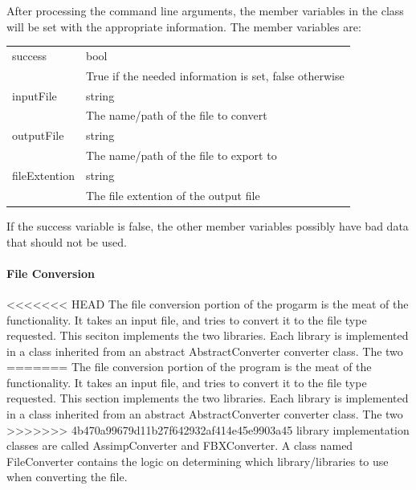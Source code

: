     After processing the command line arguments, the member variables in the class will be set with the appropriate information.  The member variables are:

    \begin{tabular}{l l}
        \centering
        success & bool \\
        & True if the needed information is set, false otherwise \\

        inputFile & string \\
        & The name/path of the file to convert \\

        outputFile & string \\
        & The name/path of the file to export to \\

        fileExtention & string \\
        & The file extention of the output file
    \end{tabular}

    If the success variable is false, the other member variables possibly have bad data that should not be used.

    \paragraph{File Conversion}
    \hfill \break
<<<<<<< HEAD
    The file conversion portion of the progarm is the meat of the functionality.  It takes an input file, and tries to convert it to the file type requested.
    This seciton implements the two libraries.  Each library is implemented in a class inherited from an abstract AbstractConverter converter class.  The two 
=======
    The file conversion portion of the program is the meat of the functionality.  It takes an input file, and tries to convert it to the file type requested.
    This section implements the two libraries.  Each library is implemented in a class inherited from an abstract AbstractConverter converter class.  The two 
>>>>>>> 4b470a99679d11b27f642932af414e45e9903a45
    library implementation classes are called AssimpConverter and FBXConverter.  A class named FileConverter contains the logic on determining which 
    library/libraries to use when converting the file.

